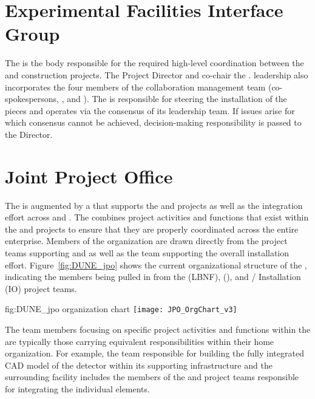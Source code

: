 \section{Experimental Facilities Interface Group}
\label{sec:efig}

The  is the body responsible for the required high-level
coordination between the  and  construction 
projects.  The  Project Director and  
co-chair the .   leadership also incorporates 
the four members of the  collaboration management 
team (co-spokespersons, , and ).  
The  is responsible for steering the  
installation of the  pieces and operates via the 
consensus of its leadership team.  If issues arise for which consensus 
cannot be achieved, decision-making responsibility is passed to the 
 Director.

\section{Joint Project Office}
\label{sec:jpo}

The  is augmented by a  that supports the
 and  projects as well as the integration
effort across  and . The  
combines project activities and functions that exist within the 
 and  projects to ensure that they are 
properly coordinated across the entire enterprise.  Members of 
the  organization are drawn directly from the project 
teams supporting  and  as well as the 
team supporting the overall  installation effort.  
Figure~\ref{fig:DUNE_jpo} shows the current organizational 
structure of the , indicating the members being 
pulled in from the  (LBNF),  (), and 
/  Installation (IO) 
project teams.
\begin{dunefigure}{fig:DUNE_jpo}
  { organization chart}
  \texttt{[image: JPO\_OrgChart\_v3]}
\end{dunefigure}
The team members focusing on specific project activities and 
functions within the  are typically those carrying 
equivalent responsibilities within their home organization.  For 
example, the  team responsible for building the fully 
integrated \threed CAD model of the detector within its supporting 
infrastructure and the surrounding facility includes the members 
of the  and  project teams responsible 
for integrating the individual elements.

